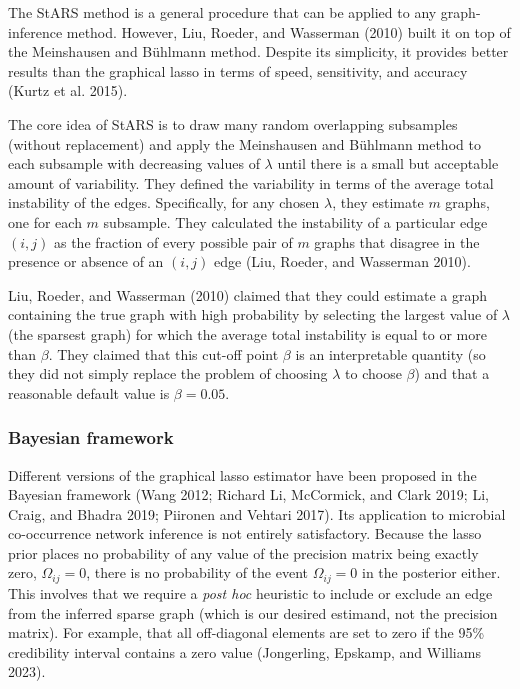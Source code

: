 \documentclass[
  a4paper,
]{article}
\begin{document}
The StARS method is a general procedure that can be applied to any
graph-inference method. However, Liu, Roeder, and Wasserman (2010) built
it on top of the Meinshausen and Bühlmann method. Despite its
simplicity, it provides better results than the graphical lasso in terms
of speed, sensitivity, and accuracy (Kurtz et al. 2015).

The core idea of StARS is to draw many random overlapping subsamples
(without replacement) and apply the Meinshausen and Bühlmann method to
each subsample with decreasing values of \(\lambda\) until there is a
small but acceptable amount of variability. They defined the variability
in terms of the average total instability of the edges. Specifically,
for any chosen \(\lambda\), they estimate \(m\) graphs, one for each
\(m\) subsample. They calculated the instability of a particular edge
\((i, j)\) as the fraction of every possible pair of \(m\) graphs that
disagree in the presence or absence of an \((i, j)\) edge (Liu, Roeder,
and Wasserman 2010).

Liu, Roeder, and Wasserman (2010) claimed that they could estimate a
graph containing the true graph with high probability by selecting the
largest value of \(\lambda\) (the sparsest graph) for which the average
total instability is equal to or more than \(\beta\). They claimed that
this cut-off point \(\beta\) is an interpretable quantity (so they did
not simply replace the problem of choosing \(\lambda\) to choose
\(\beta\)) and that a reasonable default value is \(\beta = 0.05\).

\hypertarget{bayesian-framework}{%
\subsubsection{Bayesian framework}\label{bayesian-framework}}

Different versions of the graphical lasso estimator have been proposed
in the Bayesian framework (Wang 2012; Richard Li, McCormick, and Clark
2019; Li, Craig, and Bhadra 2019; Piironen and Vehtari 2017). Its
application to microbial co-occurrence network inference is not entirely
satisfactory. Because the lasso prior places no probability of any value
of the precision matrix being exactly zero, \(\Omega_{ij}=0\), there is
no probability of the event \(\Omega_{ij}=0\) in the posterior either.
This involves that we require a \emph{post hoc} heuristic to include or
exclude an edge from the inferred sparse graph (which is our desired
estimand, not the precision matrix). For example, that all off-diagonal
elements are set to zero if the 95\% credibility interval contains a
zero value (Jongerling, Epskamp, and Williams 2023).
\end{document}
